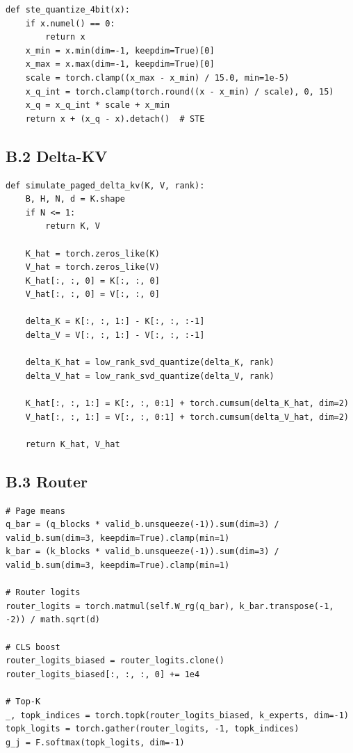 \begin{lstlisting}
def ste_quantize_4bit(x):
    if x.numel() == 0:
        return x
    x_min = x.min(dim=-1, keepdim=True)[0]
    x_max = x.max(dim=-1, keepdim=True)[0]
    scale = torch.clamp((x_max - x_min) / 15.0, min=1e-5)
    x_q_int = torch.clamp(torch.round((x - x_min) / scale), 0, 15)
    x_q = x_q_int * scale + x_min
    return x + (x_q - x).detach()  # STE
\end{lstlisting}

\subsection{B.2 Delta-KV}

\begin{lstlisting}
def simulate_paged_delta_kv(K, V, rank):
    B, H, N, d = K.shape
    if N <= 1:
        return K, V
    
    K_hat = torch.zeros_like(K)
    V_hat = torch.zeros_like(V)
    K_hat[:, :, 0] = K[:, :, 0]
    V_hat[:, :, 0] = V[:, :, 0]
    
    delta_K = K[:, :, 1:] - K[:, :, :-1]
    delta_V = V[:, :, 1:] - V[:, :, :-1]
    
    delta_K_hat = low_rank_svd_quantize(delta_K, rank)
    delta_V_hat = low_rank_svd_quantize(delta_V, rank)
    
    K_hat[:, :, 1:] = K[:, :, 0:1] + torch.cumsum(delta_K_hat, dim=2)
    V_hat[:, :, 1:] = V[:, :, 0:1] + torch.cumsum(delta_V_hat, dim=2)
    
    return K_hat, V_hat
\end{lstlisting}

\subsection{B.3 Router}

\begin{lstlisting}
# Page means
q_bar = (q_blocks * valid_b.unsqueeze(-1)).sum(dim=3) / valid_b.sum(dim=3, keepdim=True).clamp(min=1)
k_bar = (k_blocks * valid_b.unsqueeze(-1)).sum(dim=3) / valid_b.sum(dim=3, keepdim=True).clamp(min=1)

# Router logits
router_logits = torch.matmul(self.W_rg(q_bar), k_bar.transpose(-1, -2)) / math.sqrt(d)

# CLS boost
router_logits_biased = router_logits.clone()
router_logits_biased[:, :, :, 0] += 1e4

# Top-K
_, topk_indices = torch.topk(router_logits_biased, k_experts, dim=-1)
topk_logits = torch.gather(router_logits, -1, topk_indices)
g_j = F.softmax(topk_logits, dim=-1)
\end{lstlisting}

